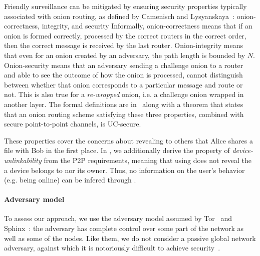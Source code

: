Friendly surveillance can be mitigated by ensuring security properties 
typically associated with onion routing, as defined by Camenisch and Lysyanskaya~\cite{CLOnionRouting}: 
onion-correctness, integrity, and security %
Informally, onion-correctness means that if an onion is formed
correctly, processed by the correct routers in the correct order, then
the correct message is received by the last router. Onion-integrity
means that even for an onion created by an adversary, the path length
is bounded by $N$. Onion-security means that an adversary sending a
challenge onion to a router and able to see the outcome of how the
onion is processed, cannot distinguish between whether that onion
corresponds to a particular message and route or not. This is also
true for a \emph{re-wrapped} onion, i.e. a challenge onion wrapped in
another layer. The formal definitions are in~\cite{CLOnionRouting} along
with a theorem that states that an onion routing scheme satisfying
these three properties, combined with secure point-to-point channels,
is UC-secure.

These properties cover the concerns about
revealing to others that Alice shares a file with Bob in the first
place. In \name, we additionally derive the property of
\emph{device-unlinkability} from the \ac{P2P} requirements, meaning that
using \name does not reveal the \squad a device belongs to nor its
owner. Thus, no information on the user's behavior (e.g. being online)
can be infered through \name. 


  

\paragraph*{Adversary model} To assess our approach, we use the
adversary model assumed by Tor~\cite{Tor} and Sphinx~\cite{Sphinx}:
the adversary has complete control over some part of the network as
well as some of the nodes. Like them, we do not consider a passive global network
adversary, against which it is notoriously difficult to achieve
security~\cite{SystemsForAnonymousCommunication}.
